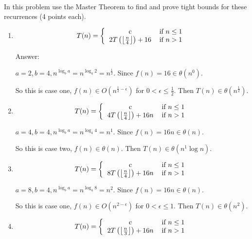 \documentclass[paper=a4, fontsize=11pt]{scrartcl}
\numberwithin{equation}{section}		%
\numberwithin{figure}{section}			%
\numberwithin{table}{section}				%
\begin{document}
In this problem use the Master Theorem to find and prove tight bounds for these recurrences (4 points each).
\begin{enumerate}
\item \[
T(n) = \left\{
\begin{tabular}{cc}
c & \text{if} $n\leq 1$ \\
$2T\left(\left\lfloor\frac{n}{4}\right\rfloor\right)+16$ & \text{if} $n>1$ \\
\end{tabular}\right.
\]

Answer:

$a=2, b = 4, n^{\log_b a} = n^{\log_4 2} = n^\frac{1}{2}$. Since $f(n) = 16 \in \theta(n^0)$. 

So this is case one, $f(n) \in O(n^{\frac{1}{2} - \epsilon})$ for $0 < \epsilon \leq \frac{1}{2}$. Then $T(n) \in \theta(n^{\frac{1}{2}})$.


\item \[
T(n) = \left\{
\begin{tabular}{cc}
c & \text{if} $n \leq 1$ \\
$4T\left(\left\lfloor\frac{n}{4}\right\rfloor\right)+16n$ & \text{if} $n>1$ \\
\end{tabular}\right.
\]

$a=4, b = 4, n^{\log_b a} = n^{\log_4 4} = n^1$. Since $f(n) = 16n \in \theta(n)$. 

So this is case two, $f(n) \in \theta(n)$. Then $T(n) \in \theta(n^1\log n)$.

\item \[
T(n) = \left\{
\begin{tabular}{cc}
c & \text{if} $n \leq 1$ \\
$8T\left(\left\lfloor\frac{n}{4}\right\rfloor\right)+16n$ & \text{if} $n>1$ \\
\end{tabular}\right.
\]

$a=8, b = 4, n^{\log_b a} = n^{\log_4 8} = n^2$. Since $f(n) = 16n \in \theta(n)$. 

So this is case one, $f(n) \in O(n^{2 - \epsilon})$ for $0 < \epsilon \leq 1$. Then $T(n) \in \theta(n^2)$.

\item \[
T(n) = \left\{
\begin{tabular}{cc}
c & \text{if} $n \leq 1$ \\
$2T\left(\left\lfloor\frac{n}{3}\right\rfloor\right)+16n$ & \text{if} $n>1$ \\
\end{tabular}\right.
\]


\end{enumerate}
\end{document}
